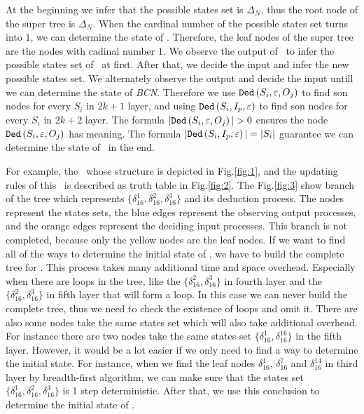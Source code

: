 At the beginning we infer that the possible states set is $\Delta_N$, thus the root node of the super tree is $\Delta_N$. When the cardinal number of the possible states set turns into $1$, we can determine the state of \BCN. Therefore, the leaf nodes of the super tree are the nodes with cadinal number $1$. We observe the output of \BCN\ to infer the possible states set of \BCN\ at first. After that, we decide the input and infer the new possible states set. We alternately observe the output and decide the input untill we can determine the state of {\em BCN}. Therefore we use ${\tt Ded}\left(S_i,\varepsilon, O_j\right)$ to find son nodes for every $S_i$ in $2k+1$ layer, and using ${\tt Ded}\left(S_i,I_p,\varepsilon\right)$ to find son nodes for every $S_i$ in $2k+2$ layer. The formula $|\Ded\left(S_i,\varepsilon, O_j\right)|>0$ ensures the node ${\tt Ded}\left(S_i,\varepsilon, O_j\right)$ has meaning. The formula $|{\tt Ded}\left(S_i,I_p,\varepsilon\right)|=|S_i|$ guarantee we can determine the state of \BCN\ in the end. 
\begin{example}
For example, the \BCN\ whose structure is depicted in Fig.\ref{fig:1}, and the updating rules of this \BCN\ is described as truth table in Fig.\ref{fig:2}. The Fig.\ref{fig:3} show branch of the tree which represents $\{\delta_{16}^1,\delta_{16}^2,\delta_{16}^3\}$ and its deduction process. The nodes represent the states sets, the blue edges represent the observing output processes, and the orange edges represent the deciding input processes. This branch is not completed, because only the yellow nodes are the leaf nodes. If we want to find all of the ways to determine the initial state of \BCN, we have to build the complete tree for \BCN. This process takes many additional time and space overhead. Especially when there are loops in the tree, like the $\{\delta_{16}^2,\delta_{16}^3\}$ in fourth layer and the $\{\delta_{16}^2,\delta_{16}^3\}$ in fifth layer that will form a loop. In this case we can never build the complete tree, thus we need to check the existence of loops and omit it. There are also some nodes take the same states set which will also take additional overhead. For instance there are two nodes take the same states set $\{\delta_{16}^1,\delta_{16}^{16}\}$ in the fifth layer. However, it would be a lot easier if we only need to find a way to determine the initial state. For instance, when we find the leaf nodes $\delta_{16}^1$, $\delta_{16}^7$ and  $\delta_{16}^{14}$ in third layer by breadth-first algorithm, we can make sure that the states set $\{\delta_{16}^1,\delta_{16}^2,\delta_{16}^3\}$ is 1 step deterministic. After that, we use this conclusion to determine the initial state of \BCN. 
\end{example}   
